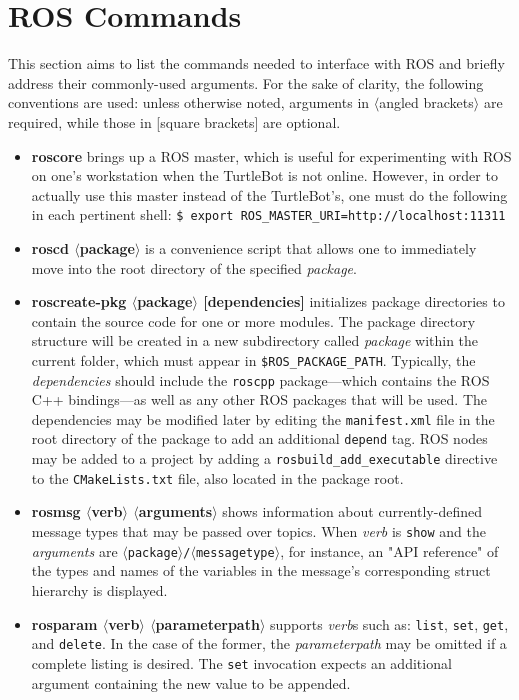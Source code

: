\documentclass[12pt]{report}
\begin{document}
\section{ROS Commands}
This section aims to list the commands needed to interface with ROS and briefly address their commonly-used arguments.  For the sake of clarity, the following conventions are used: unless otherwise noted, arguments in $\langle$angled brackets$\rangle$ are required, while those in [square brackets] are optional.
\begin{itemize}
\item{\textbf{roscore} brings up a ROS master, which is useful for experimenting with ROS on one's workstation when the TurtleBot is not online.  However, in order to actually use this master instead of the TurtleBot's, one must do the following in each pertinent shell: \texttt{\$\ export ROS\_MASTER\_URI=http://localhost:11311}}
\item{\textbf{roscd $\langle$package$\rangle$} is a convenience script that allows one to immediately move into the root directory of the specified \textit{package}.}
\item{\textbf{roscreate-pkg $\langle$package$\rangle$ [dependencies]} initializes package directories to contain the source code for one or more modules.  The package directory structure will be created in a new subdirectory called \textit{package} within the current folder, which must appear in \texttt{\$ROS\_PACKAGE\_PATH}.  Typically, the \textit{dependencies} should include the \texttt{roscpp} package---which contains the ROS C++ bindings---as well as any other ROS packages that will be used.  The dependencies may be modified later by editing the \texttt{manifest.xml} file in the root directory of the package to add an additional \texttt{depend} tag.  ROS nodes may be added to a project by adding a \texttt{rosbuild\_add\_executable} directive to the \texttt{CMakeLists.txt} file, also located in the package root.}
\item{\textbf{rosmsg $\langle$verb$\rangle$ $\langle$arguments$\rangle$} shows information about currently-defined message types that may be passed over topics.  When \textit{verb} is \texttt{show} and the \textit{arguments} are \texttt{$\langle$package$\rangle$/$\langle$messagetype$\rangle$}, for instance, an "API reference" of the types and names of the variables in the message's corresponding struct hierarchy is displayed.}
\item{\textbf{rosparam $\langle$verb$\rangle$ $\langle$parameterpath$\rangle$} supports \textit{verb}s such as: \texttt{list}, \texttt{set}, \texttt{get}, and \texttt{delete}.  In the case of the former, the \textit{parameterpath} may be omitted if a complete listing is desired.  The \texttt{set} invocation expects an additional argument containing the new value to be appended.}

\end{itemize}
\end{document}
